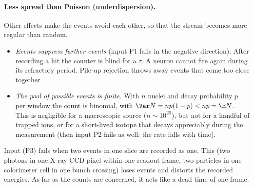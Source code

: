 \paragraph{Less spread than Poisson (underdispersion).} Other effects make the events avoid each other, so that the stream becomes more regular than random.
\begin{itemize}[leftmargin=1.4em,itemsep=1pt]
  \item \emph{Events suppress further events} (input P1 fails in the negative direction). After recording a hit the counter is blind for a  $\tau$. A neuron cannot fire again during its refractory period. Pile-up rejection throws away events that come too close together.
  \item \emph{The pool of possible events is finite.} With $n$ nuclei and decay probability $p$ per window the count is binomial, with $\Var N=np(1-p)<np=\E N$. This is negligible for a macroscopic source ($n\sim10^{20}$), but not for a handful of trapped ions, or for a short-lived isotope that decays appreciably during the measurement (then input P2 fails as well: the rate falls with time).
\end{itemize}
Input (P3) fails when two events in one slice are recorded as one. This  (two photons in one X-ray CCD pixel within one readout frame, two particles in one calorimeter cell in one bunch crossing) loses events and distorts the recorded energies. As far as the counts are concerned, it acts like a dead time of one frame.

